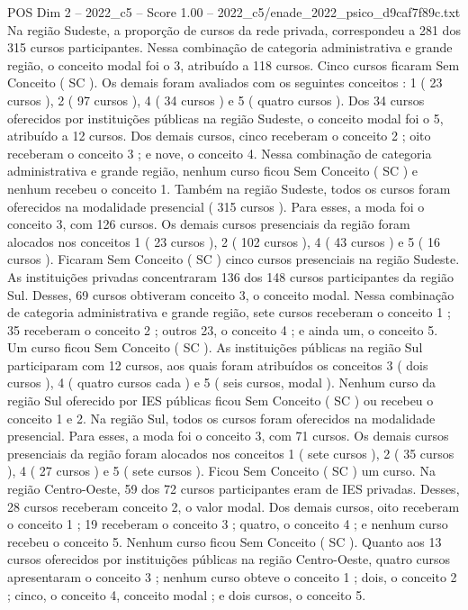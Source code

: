 \begin{textsample}{POS Dim 2 – 2022\_c5 – Score 1.00 – 2022\_c5/enade\_2022\_psico\_d9caf7f89c.txt}
Na região Sudeste, a proporção de cursos da rede privada, correspondeu a 281 dos 315 cursos participantes.
Nessa combinação de categoria administrativa e grande região, o conceito modal foi o 3, atribuído a 118 cursos.
Cinco cursos ficaram Sem Conceito ( SC ).
Os demais foram avaliados com os seguintes conceitos : 1 ( 23 cursos ), 2 ( 97 cursos ), 4 ( 34 cursos ) e 5 ( quatro cursos ).
Dos 34 cursos oferecidos por instituições públicas na região Sudeste, o conceito modal foi o 5, atribuído a 12 cursos.
Dos demais cursos, cinco receberam o conceito 2 ; oito receberam o conceito 3 ; e nove, o conceito 4.
Nessa combinação de categoria administrativa e grande região, nenhum curso ficou Sem Conceito ( SC ) e nenhum recebeu o conceito 1.
Também na região Sudeste, todos os cursos foram oferecidos na modalidade presencial ( 315 cursos ).
Para esses, a moda foi o conceito 3, com 126 cursos.
Os demais cursos presenciais da região foram alocados nos conceitos 1 ( 23 cursos ), 2 ( 102 cursos ), 4 ( 43 cursos ) e 5 ( 16 cursos ).
Ficaram Sem Conceito ( SC ) cinco cursos presenciais na região Sudeste.
As instituições privadas concentraram 136 dos 148 cursos participantes da região Sul.
Desses, 69 cursos obtiveram conceito 3, o conceito modal.
Nessa combinação de categoria administrativa e grande região, sete cursos receberam o conceito 1 ; 35 receberam o conceito 2 ; outros 23, o conceito 4 ; e ainda um, o conceito 5.
Um curso ficou Sem Conceito ( SC ).
As instituições públicas na região Sul participaram com 12 cursos, aos quais foram atribuídos os conceitos 3 ( dois cursos ), 4 ( quatro cursos cada ) e 5 ( seis cursos, modal ).
Nenhum curso da região Sul oferecido por IES públicas ficou Sem Conceito ( SC ) ou recebeu o conceito 1 e 2.
Na região Sul, todos os cursos foram oferecidos na modalidade presencial.
Para esses, a moda foi o conceito 3, com 71 cursos.
Os demais cursos presenciais da região foram alocados nos conceitos 1 ( sete cursos ), 2 ( 35 cursos ), 4 ( 27 cursos ) e 5 ( sete cursos ).
Ficou Sem Conceito ( SC ) um curso.
Na região Centro-Oeste, 59 dos 72 cursos participantes eram de IES privadas.
Desses, 28 cursos receberam conceito 2, o valor modal.
Dos demais cursos, oito receberam o conceito 1 ; 19 receberam o conceito 3 ; quatro, o conceito 4 ; e nenhum curso recebeu o conceito 5.
Nenhum curso ficou Sem Conceito ( SC ).
Quanto aos 13 cursos oferecidos por instituições públicas na região Centro-Oeste, quatro cursos apresentaram o conceito 3 ; nenhum curso obteve o conceito 1 ; dois, o conceito 2 ; cinco, o conceito 4, conceito modal ; e dois cursos, o conceito 5.

\end{textsample}
